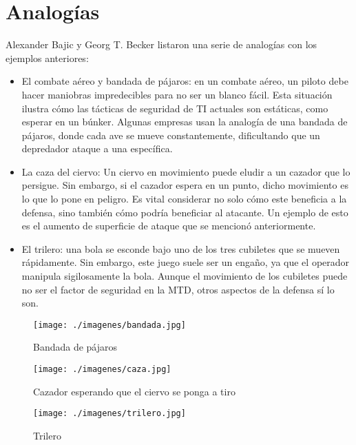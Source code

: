\section{Analogías}

Alexander Bajic y Georg T. Becker listaron una serie de analogías\cite{MTD-critica} con los ejemplos anteriores:
\begin{itemize}
    \item El combate aéreo y bandada de pájaros: en un combate aéreo, un piloto debe hacer maniobras impredecibles para no ser un blanco fácil. Esta situación ilustra cómo las tácticas de seguridad de TI actuales son estáticas, como esperar en un búnker. Algunas empresas usan la analogía de una bandada de pájaros, donde cada ave se mueve constantemente, dificultando que un depredador ataque a una específica.
    \item La caza del ciervo: Un ciervo en movimiento puede eludir a un cazador que lo persigue. Sin embargo, si el cazador espera en un punto, dicho movimiento es lo que lo pone en peligro. Es vital considerar no solo cómo este beneficia a la defensa, sino también cómo podría beneficiar al atacante. Un ejemplo de esto es el aumento de superficie de ataque que se mencionó anteriormente.
    \item El trilero: una bola se esconde bajo uno de los tres cubiletes que se mueven rápidamente. Sin embargo, este juego suele ser un engaño, ya que el operador manipula sigilosamente la bola. Aunque el movimiento de los cubiletes puede no ser el factor de seguridad en la MTD, otros aspectos de la defensa sí lo son.
\end{itemize}

\begin{figure}[h]
    \centering
    \begin{minipage}{.3\textwidth}
        \centering
        \texttt{[image: ./imagenes/bandada.jpg]}
        \caption{Bandada de pájaros\cite{bandada-pajaros}}
    \end{minipage}
    \hfill
    \begin{minipage}{.3\textwidth}
        \centering
        \texttt{[image: ./imagenes/caza.jpg]}
        \caption{Cazador esperando que el ciervo se ponga a tiro\cite{caza}}
    \end{minipage}
    \hfill
    \begin{minipage}{.3\textwidth}
        \centering
        \texttt{[image: ./imagenes/trilero.jpg]}
        \caption{Trilero\cite{trilero}}
    \end{minipage}
\end{figure}
